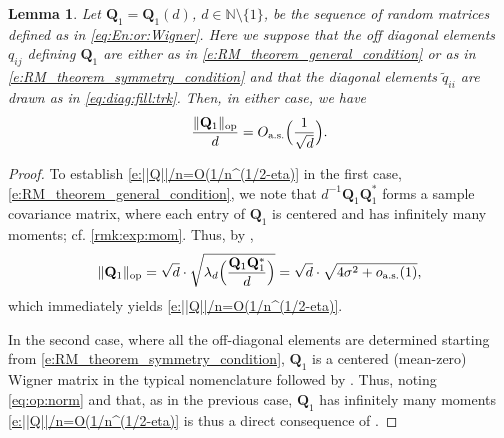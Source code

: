 \documentclass[9pt,twocolumn,twoside]{pnas-new}
\newcommand{\bbN}{{\mathbb N}}
\newcommand{\?}{\textbf{?}}
\newcommand{\op}{\textnormal{op}}
\newcommand{\as}{\textnormal{a.s.}}
\newcommand{\QQ}{\mathbf{Q}}
\newtheorem{lemma}{\bf Lemma}
\begin{document}
\begin{lemma}\label{l:||Q||/n=O(1/n^(1/2-eta)}
  Let $\QQ_1 = \QQ_1(d)$, $d \in \bbN \setminus \{1\}$, be the
  sequence of random matrices defined as in \eqref{eq:En:or:Wigner}.
  Here we suppose that the off diagonal elements $q_{ij}$ defining
  $\QQ_1$ are either as in \eqref{e:RM_theorem_general_condition} or
  as in \eqref{e:RM_theorem_symmetry_condition} and that the diagonal
  elements $\widetilde{q}_{ii}$ are drawn as in
  \eqref{eq:diag:fill:trk}.  Then, in either case, we have
  \begin{equation}\label{e:||Q||/n=O(1/n^(1/2-eta)}
    \frac{\|\QQ_1\|_{\op}}{d} = O_{\as}\Big( \frac{1}{\sqrt{d}}\Big).
  \end{equation}
\end{lemma}
\begin{proof}
  To establish \eqref{e:||Q||/n=O(1/n^(1/2-eta)} in the first case,
  \eqref{e:RM_theorem_general_condition}, we note that
  $d^{-1}\QQ_1 \QQ^*_1$ forms a sample covariance matrix, where each
  entry of $\QQ_1$ is centered and has infinitely many moments; cf.
  \cref{rmk:exp:mom}. Thus, by \cite[Theorem 3.1, p.\
  517]{yin:bai:krishnaiah:1988},
\begin{equation}\label{e:|Q-tilde_1|=sqrt(n)OP(1)}
  \|\QQ_1\|_{\op} = \sqrt{d}\cdot \sqrt{\lambda_{d}\Big(\frac{\QQ_1 \QQ^*_1}{d}\Big)}
  = \sqrt{d}\cdot \sqrt{4 \sigma^2 + o_{\as}(1)},
\end{equation}
which immediately yields \eqref{e:||Q||/n=O(1/n^(1/2-eta)}.

In the second case, where all the off-diagonal elements are determined
starting from \eqref{e:RM_theorem_symmetry_condition}, $\QQ_1$ is a
centered (mean-zero) Wigner matrix in the typical nomenclature
followed by \cite{bai:1999}.  Thus, noting \eqref{eq:op:norm} and
that, as in the previous case, $\QQ_1$ has infinitely many moments
\eqref{e:||Q||/n=O(1/n^(1/2-eta)} is thus a direct consequence of
\cite[Theorem 2.12, p.\ 630]{bai:1999}.
\end{proof}
\end{document}
